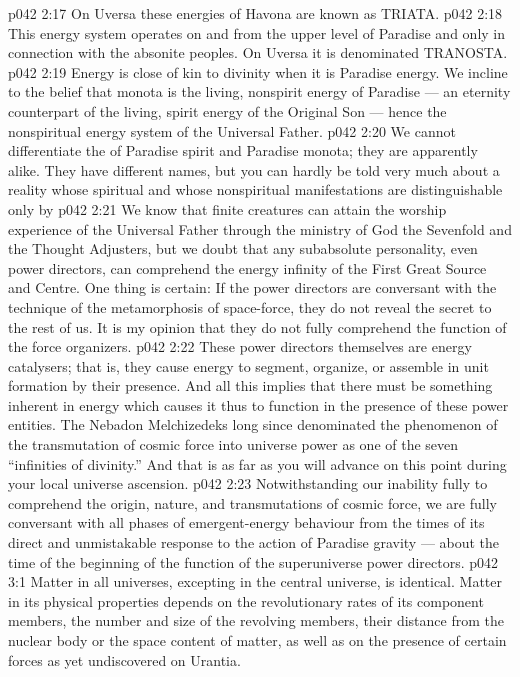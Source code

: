 \vs p042 2:17 On Uversa these energies of Havona are known as TRIATA.
\vs p042 2:18 \bibnobreakspace {} This energy system operates on and from the upper level of Paradise and only in connection with the absonite peoples. On Uversa it is denominated TRANOSTA.
\vs p042 2:19 \bibnobreakspace {} Energy is close of kin to divinity when it is Paradise energy. We incline to the belief that monota is the living, nonspirit energy of Paradise --- an eternity counterpart of the living, spirit energy of the Original Son --- hence the nonspiritual energy system of the Universal Father.
\vs p042 2:20 We cannot differentiate the  of Paradise spirit and Paradise monota; they are apparently alike. They have different names, but you can hardly be told very much about a reality whose spiritual and whose nonspiritual manifestations are distinguishable only by 
\vs p042 2:21 \pc We know that finite creatures can attain the worship experience of the Universal Father through the ministry of God the Sevenfold and the Thought Adjusters, but we doubt that any subabsolute personality, even power directors, can comprehend the energy infinity of the First Great Source and Centre. One thing is certain: If the power directors are conversant with the technique of the metamorphosis of space\hyp{}force, they do not reveal the secret to the rest of us. It is my opinion that they do not fully comprehend the function of the force organizers.
\vs p042 2:22 These power directors themselves are energy catalysers; that is, they cause energy to segment, organize, or assemble in unit formation by their presence. And all this implies that there must be something inherent in energy which causes it thus to function in the presence of these power entities. The Nebadon Melchizedeks long since denominated the phenomenon of the transmutation of cosmic force into universe power as one of the seven “infinities of divinity.” And that is as far as you will advance on this point during your local universe ascension.
\vs p042 2:23 \pc Notwithstanding our inability fully to comprehend the origin, nature, and transmutations of cosmic force, we are fully conversant with all phases of emergent\hyp{}energy behaviour from the times of its direct and unmistakable response to the action of Paradise gravity --- about the time of the beginning of the function of the superuniverse power directors.
\vs p042 3:1 Matter in all universes, excepting in the central universe, is identical. Matter in its physical properties depends on the revolutionary rates of its component members, the number and size of the revolving members, their distance from the nuclear body or the space content of matter, as well as on the presence of certain forces as yet undiscovered on Urantia.
